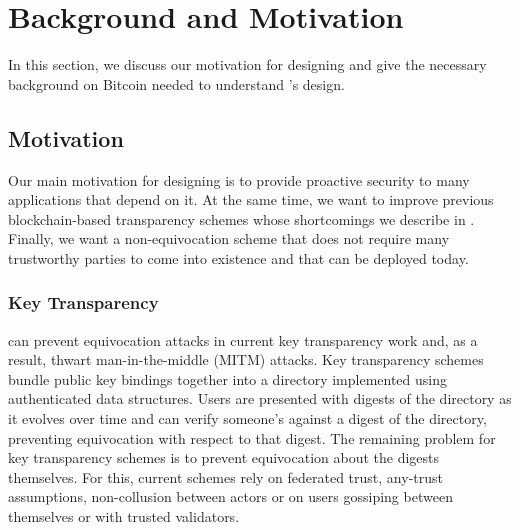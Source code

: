 \section{Background and Motivation}
\label{sec:background}
In this section, we discuss our motivation for designing \Sys and give the necessary background on Bitcoin needed to understand \Sys's design.

\subsection{Motivation}
\label{sec:background:motivation}
Our main motivation for designing \Sys is to provide proactive security to many applications that depend on it.
At the same time, we want to improve previous blockchain-based transparency schemes\cite{keybase,virtualchain} whose shortcomings we describe in .
Finally, we want a non-equivocation scheme that does not require many trustworthy parties to come into existence and that can be deployed today.

\subsubsection{Key Transparency}
\label{sec:background:motivation:key-transparency}
\Sys can prevent equivocation attacks in current key transparency work\cite{ct,ect,dtki,arpki,aki,coniks} and, as a result, thwart man-in-the-middle (MITM) attacks.
Key transparency schemes bundle public key bindings together into a directory implemented using authenticated data structures\cite{ad}.
Users are presented with digests of the directory as it evolves over time and can verify someone's \pk against a digest of the directory, preventing equivocation with respect to that digest.
The remaining problem for key transparency schemes is to prevent equivocation about the digests themselves.
For this, current schemes rely on federated trust\cite{coniks}, any-trust assumptions\cite{arpki}, non-collusion between actors\cite{arpki, aki} or on users gossiping between themselves\cite{ctgossip,ect,coniks,dtki} or with trusted validators\cite{aki}.


